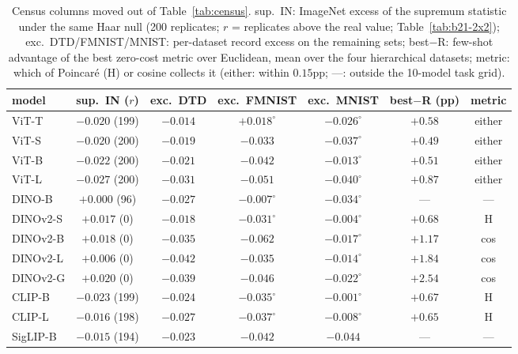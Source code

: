 \begin{table}[H]
\centering
\small
\setlength{\tabcolsep}{4.5pt}
\begin{tabular}{l c c c c c c}
\toprule
model & sup.\ IN ($r$) & exc.\ DTD & exc.\ FMNIST & exc.\ MNIST & best$-$R (pp) & metric \\
\midrule
ViT-T & $-0.020$ (199) & $-0.014$ & $+0.018^{\circ}$ & $-0.026^{\circ}$ & $+0.58$ & either \\
ViT-S & $-0.020$ (200) & $-0.019$ & $-0.033$ & $-0.037^{\circ}$ & $+0.49$ & either \\
ViT-B & $-0.022$ (200) & $-0.021$ & $-0.042$ & $-0.013^{\circ}$ & $+0.51$ & either \\
ViT-L & $-0.027$ (200) & $-0.031$ & $-0.051$ & $-0.040^{\circ}$ & $+0.87$ & either \\
\midrule
DINO-B & $+0.000$ (96) & $-0.027$ & $-0.007^{\circ}$ & $-0.034^{\circ}$ & --- & --- \\
DINOv2-S & $+0.017$ (0) & $-0.018$ & $-0.031^{\circ}$ & $-0.004^{\circ}$ & $+0.68$ & H \\
DINOv2-B & $+0.018$ (0) & $-0.035$ & $-0.062$ & $-0.017^{\circ}$ & $+1.17$ & cos \\
DINOv2-L & $+0.006$ (0) & $-0.042$ & $-0.035$ & $-0.014^{\circ}$ & $+1.84$ & cos \\
DINOv2-G & $+0.020$ (0) & $-0.039$ & $-0.046$ & $-0.022^{\circ}$ & $+2.54$ & cos \\
\midrule
CLIP-B & $-0.023$ (199) & $-0.024$ & $-0.035^{\circ}$ & $-0.001^{\circ}$ & $+0.67$ & H \\
CLIP-L & $-0.016$ (198) & $-0.027$ & $-0.037^{\circ}$ & $-0.008^{\circ}$ & $+0.65$ & H \\
SigLIP-B & $-0.015$ (194) & $-0.023$ & $-0.042$ & $-0.044$ & --- & --- \\
\bottomrule
\end{tabular}
\caption{Census columns moved out of Table~\ref{tab:census}. sup.\ IN: ImageNet excess of the supremum statistic under the same Haar null (200 replicates; $r$ = replicates above the real value; Table~\ref{tab:b21-2x2}); exc.\ DTD/FMNIST/MNIST: per-dataset record excess on the remaining sets; best$-$R: few-shot advantage of the best zero-cost metric over Euclidean, mean over the four hierarchical datasets; metric: which of Poincar\'e (H) or cosine collects it (either: within $0.15$pp; ---: outside the 10-model task grid). %
}
\label{tab:census-extra}
\end{table}
